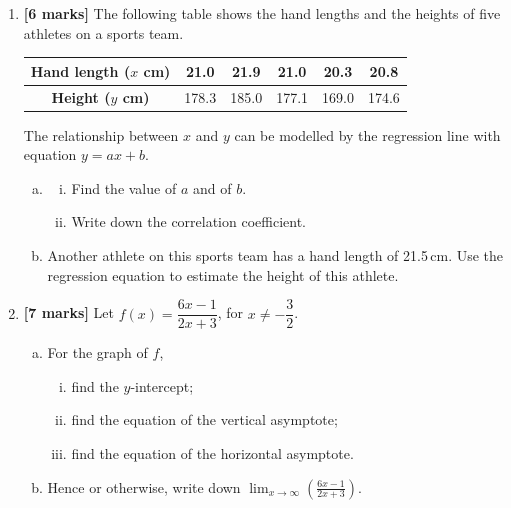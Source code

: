 \documentclass[12pt, twoside]{article}
\begin{document}
\begin{enumerate}
\vspace{1cm}

\item \textbf{[6 marks]} The following table shows the hand lengths and the heights of five athletes on a sports team.

\begin{center}
\begin{tabular}{|c|c|c|c|c|c|}
\hline
\textbf{Hand length ($x$ cm)} & 21.0 & 21.9 & 21.0 & 20.3 & 20.8 \\
\hline
\textbf{Height ($y$ cm)} & 178.3 & 185.0 & 177.1 & 169.0 & 174.6 \\
\hline
\end{tabular}
\end{center}

The relationship between $x$ and $y$ can be modelled by the regression line with equation $y = ax + b$.

\begin{enumerate}[(a)]
    \item \begin{enumerate}[(i)]
        \item Find the value of $a$ and of $b$.
        \item Write down the correlation coefficient.
    \end{enumerate}
    \item Another athlete on this sports team has a hand length of 21.5\,cm. Use the regression equation to estimate the height of this athlete.
\end{enumerate}

\vspace{1cm}

\item \textbf{[7 marks]} Let $f(x) = \dfrac{6x-1}{2x+3}$, for $x \neq -\dfrac{3}{2}$.

\begin{enumerate}[(a)]
    \item For the graph of $f$,
    \begin{enumerate}[(i)]
        \item find the $y$-intercept;
        \item find the equation of the vertical asymptote;
        \item find the equation of the horizontal asymptote.
    \end{enumerate}
    \item Hence or otherwise, write down $\displaystyle\lim_{x \to \infty} \left(\frac{6x-1}{2x+3}\right)$.
\end{enumerate}


\end{enumerate}
\end{document}
